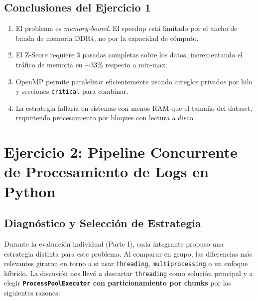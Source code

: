 \documentclass[10pt,a4paper]{article}
\begin{document}
\subsection{Conclusiones del Ejercicio 1}

\begin{enumerate}
    \item El problema es \emph{memory-bound}. El speedup est\'a limitado por
        el ancho de banda de memoria DDR4, no por la capacidad de c\'omputo.
    \item El Z-Score requiere 3 pasadas completas sobre los datos, incrementando
        el tr\'afico de memoria en $\sim$33\% respecto a min-max.
    \item OpenMP permite paralelizar eficientemente usando arreglos privados
        por hilo y secciones \texttt{critical} para combinar.
    \item La estrategia fallar\'ia en sistemas con menos RAM que el tama\~no
        del dataset, requiriendo procesamiento por bloques con lectura a disco.
\end{enumerate}

\section{Ejercicio 2: Pipeline Concurrente de Procesamiento de Logs en Python}

\subsection{Diagn\'ostico y Selecci\'on de Estrategia}

Durante la evaluaci\'on individual (Parte I), cada integrante propuso una
estrategia distinta para este problema. Al comparar en grupo, las diferencias
m\'as relevantes giraron en torno a si usar \texttt{threading},
\texttt{multiprocessing} o un enfoque h\'ibrido. La discusi\'on nos llev\'o a
descartar \texttt{threading} como soluci\'on principal y a elegir
\textbf{\texttt{ProcessPoolExecutor} con particionamiento por chunks} por las
siguientes razones:
\end{document}
